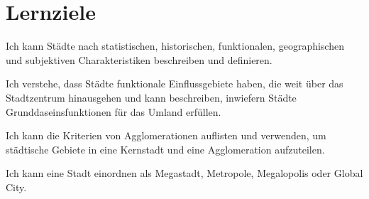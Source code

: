 \clearpage
\section{Lernziele}
\begin{todolist}
\item Ich kann Städte nach statistischen, historischen, funktionalen, geographischen und subjektiven Charakteristiken beschreiben und definieren.
\item Ich verstehe, dass Städte funktionale Einflussgebiete haben, die weit über das Stadtzentrum hinausgehen und kann beschreiben, inwiefern Städte Grunddaseinsfunktionen für das Umland erfüllen.
\item Ich kann die Kriterien von Agglomerationen auflisten und verwenden, um städtische Gebiete in eine Kernstadt und eine Agglomeration aufzuteilen.
\item Ich kann eine Stadt einordnen als Megastadt, Metropole, Megalopolis oder Global City.
\end{todolist}